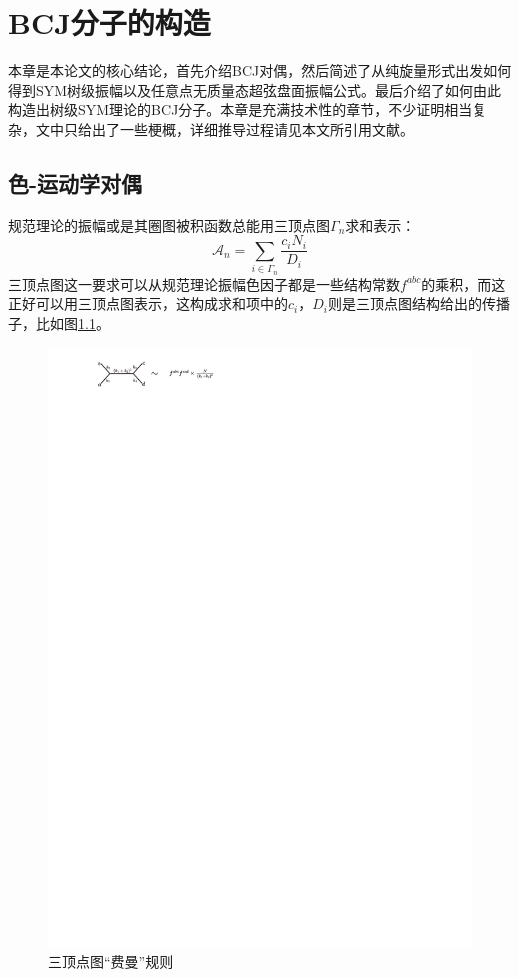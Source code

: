 \chapter{BCJ分子的构造}
本章是本论文的核心结论，首先介绍BCJ对偶，然后简述了从纯旋量形式出发如何得到SYM树级振幅以及任意点无质量态超弦盘面振幅公式。最后介绍了如何由此构造出树级SYM理论的BCJ分子。本章是充满技术性的章节，不少证明相当复杂，文中只给出了一些梗概，详细推导过程请见本文所引用文献。
\section{色-运动学对偶}
规范理论的振幅或是其圈图被积函数总能用三顶点图$\Gamma_n$求和表示：
\begin{equation}
	\label{eq:6.1}
	\mathcal{A}_n=\sum_{i\in\Gamma_n}\frac{c_iN_i}{D_i}
\end{equation}
三顶点图这一要求可以从规范理论振幅色因子都是一些结构常数$f^{abc}$的乘积，而这正好可以用三顶点图表示，这构成求和项中的$c_i$，$D_i$则是三顶点图结构给出的传播子，比如图\ref{fig:6.1}。

\begin{figure}[htbp]
	\centering
	\includegraphics[width=0.8\linewidth]{figs/fig8.pdf}
	\caption{三顶点图“费曼”规则}
	\label{fig:6.1}
\end{figure}

